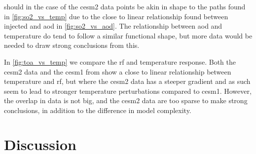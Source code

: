 \documentclass{ametsocV5}
\newcommand{\iso}[1][i]{{#1}njected \ce{SO2}}
\begin{document}

 should in the case of the \ac{cesm2} data points be akin in shape
to the paths found in \cref{fig:so2_vs_temp} due to the close to linear relationship
found between \iso{} and \ac{aod} in \cref{fig:so2_vs_aod}. The relationship between
\ac{aod} and temperature do tend to follow a similar functional shape, but more data
would be needed to draw strong conclusions from this.



In \cref{fig:toa_vs_temp} we compare the \ac{rf} and temperature response. Both the
\ac{cesm2} data and the \ac{cesm1} from \citet{ottobliesner2016} show a close to linear
relationship between temperature and \ac{rf}, but where the \ac{cesm2} data has a
steeper gradient and as such seem to lead to stronger temperature perturbations compared
to \ac{cesm1}. However, the overlap in data is not big, and the \ac{cesm2} data are too
sparse to make strong conclusions, in addition to the difference in model complexity.


\section{Discussion}%
\end{document}
